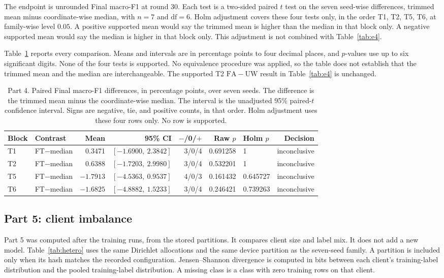 \documentclass{ieeeaccess}
\begin{document}
The endpoint is unrounded Final macro-F1 at round 30. Each test is a two-sided paired $t$ test on the seven seed-wise differences, trimmed mean minus coordinate-wise median, with $n=7$ and $\mathrm{df}=6$. Holm adjustment covers these four tests only, in the order T1, T2, T5, T6, at family-wise level $0.05$. A positive supported mean would say the trimmed mean is higher than the median in that block only. A negative supported mean would say the median is higher in that block only. This adjustment is not combined with Table~\ref{tab:e4}.

Table~\ref{tab:e5} reports every comparison. Means and intervals are in percentage points to four decimal places, and $p$-values use up to six significant digits. None of the four tests is supported. No equivalence procedure was applied, so the table does not establish that the trimmed mean and the median are interchangeable. The supported T2 $\mathrm{FA}-\mathrm{UW}$ result in Table~\ref{tab:e4} is unchanged.

\begin{table}[!t]
\centering
\caption{Part 4. Paired Final macro-F1 differences, in percentage points, over seven seeds. The difference is the trimmed mean minus the coordinate-wise median. The interval is the unadjusted 95\% paired-$t$ confidence interval. Signs are negative, tie, and positive counts, in that order. Holm adjustment uses these four rows only. No row is supported.}
\label{tab:e5}
\scriptsize
\begin{tabular}{llrrrrlr}
\hline
Block & Contrast & Mean & 95\% CI & $-$/0/$+$ & Raw $p$ & Holm $p$ & Decision \\
\hline
T1 & FT$-$median & 0.3471 & $[-1.6900,\ 2.3842]$ & 3/0/4 & 0.691258 & 1 & inconclusive \\
T2 & FT$-$median & 0.6388 & $[-1.7203,\ 2.9980]$ & 3/0/4 & 0.532201 & 1 & inconclusive \\
T5 & FT$-$median & $-1.7913$ & $[-4.5363,\ 0.9537]$ & 4/0/3 & 0.161432 & 0.645727 & inconclusive \\
T6 & FT$-$median & $-1.6825$ & $[-4.8882,\ 1.5233]$ & 3/0/4 & 0.246421 & 0.739263 & inconclusive \\
\hline
\end{tabular}
\end{table}

\subsection{Part 5: client imbalance}
Part 5 was computed after the training runs, from the stored partitions. It compares client size and label mix. It does not add a new model. Table~\ref{tab:hetero} uses the same Dirichlet allocations and the same device partition as the seven-seed family. A partition is included only when its hash matches the recorded configuration. Jensen--Shannon divergence is computed in bits between each client's training-label distribution and the pooled training-label distribution. A missing class is a class with zero training rows on that client.
\end{document}
